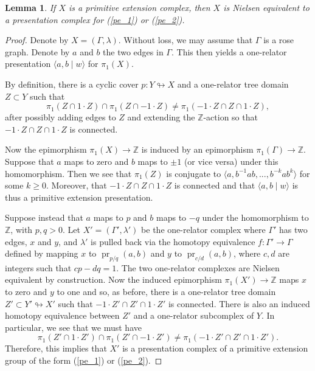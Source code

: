 \documentclass[10pt,a4paper]{amsart}
\newtheorem{lemma}{Lemma}
\newcommand{\Z}{\mathbb{Z}}
\def\immerses{\looparrowright}
\DeclareMathOperator{\pr}{pr}
\begin{document}
\begin{lemma}
\label{nielsen_equivalent}
If $X$ is a primitive extension complex, then $X$ is Nielsen equivalent to a presentation complex for (\ref{pe_1}) or (\ref{pe_2}).
\end{lemma}

\begin{proof}
Denote by $X = (\Gamma, \lambda)$. Without loss, we may assume that $\Gamma$ is a rose graph. Denote by $a$ and $b$ the two edges in $\Gamma$. This then yields a one-relator presentation $\langle a, b \mid w\rangle$ for $\pi_1(X)$. 


By definition, there is a cyclic cover $p:Y\immerses X$ and a one-relator tree domain $Z\subset Y$ such that
\[
\pi_1(Z\cap 1\cdot Z)\cap \pi_1(Z\cap -1\cdot Z)\neq \pi_1(-1\cdot Z\cap Z\cap 1\cdot Z),
\]
after possibly adding edges to $Z$ and extending the $\Z$-action so that $-1\cdot Z\cap Z\cap 1\cdot Z$ is connected. 

Now the epimorphism $\pi_1(X)\to \Z$ is induced by an epimorphism $\pi_1(\Gamma)\to \Z$. Suppose that $a$ maps to zero and $b$ maps to $\pm1$ (or vice versa) under this homomorphism. Then we see that $\pi_1(Z)$ is conjugate to $\langle a, b^{-1}ab, ..., b^{-k}ab^k\rangle$ for some $k\geq 0$. Moreover, that $-1\cdot Z\cap Z\cap 1\cdot Z$ is connected and that $\langle a, b\mid w\rangle$ is thus a primitive extension presentation.

Suppose instead that $a$ maps to $p$ and $b$ maps to $-q$ under the homomorphism to $\Z$, with $p, q>0$. Let $X' = (\Gamma', \lambda')$ be the one-relator complex where $\Gamma'$ has two edges, $x$ and $y$, and $\lambda'$ is pulled back via the homotopy equivalence $f:\Gamma'\to \Gamma$ defined by mapping $x$ to $\pr_{p/q}(a, b)$ and $y$ to $\pr_{c/d}(a, b)$, where $c, d$ are integers such that $cp - dq = 1$. The two one-relator complexes are Nielsen equivalent by construction. Now the induced epimorphism $\pi_1(X')\to \Z$ maps $x$ to zero and $y$ to one and so, as before, there is a one-relator tree domain $Z'\subset Y'\immerses X'$ such that $-1\cdot Z'\cap Z'\cap 1\cdot Z'$ is connected. There is also an induced homotopy equivalence between $Z'$ and a one-relator subcomplex of $Y$. In particular, we see that we must have
\[
\pi_1(Z'\cap 1\cdot Z')\cap \pi_1(Z'\cap -1\cdot Z')\neq \pi_1(-1\cdot Z'\cap Z'\cap 1\cdot Z').
\]
Therefore, this implies that $X'$ is a presentation complex of a primitive extension group of the form (\ref{pe_1}) or (\ref{pe_2}).
\end{proof}
\end{document}
